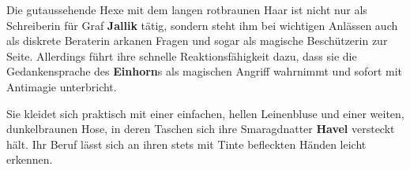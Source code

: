 Die gutaussehende Hexe mit dem langen rotbraunen Haar ist nicht nur als Schreiberin für Graf \textbf{Jallik} tätig, sondern steht ihm bei wichtigen Anlässen auch als diskrete Beraterin arkanen Fragen und sogar als magische Beschützerin zur Seite. Allerdings führt ihre schnelle Reaktionsfähigkeit dazu, dass sie die Gedankensprache des \textbf{Einhorn}s als magischen Angriff wahrnimmt und sofort mit Antimagie unterbricht.

Sie kleidet sich praktisch mit einer einfachen, hellen Leinenbluse und einer weiten, dunkelbraunen Hose, in deren Taschen sich ihre Smaragdnatter \textbf{Havel} versteckt hält. Ihr Beruf lässt sich an ihren stets mit Tinte befleckten Händen leicht erkennen.

\spaltenende